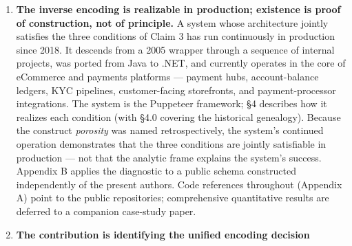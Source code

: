 \documentclass[
]{article}
\providecommand{\tightlist}{%
  \setlength{\itemsep}{0pt}\setlength{\parskip}{0pt}}
\begin{document}
\begin{enumerate}
  \begin{itemize}
  \tightlist
  \item
    \emph{Domain}: one class per role --- one variant per operation
    outcome --- with sum-type discrimination supported natively. The
    form a row takes is determined by the operation that produced it,
    not by the union of possible statuses.
  \item
    \emph{Endpoint}: DTOs with filterable optional parameters; the same
    contract serves heterogeneous use groups but each invocation selects
    only the slots its case expresses.
  \item
    \emph{Persistence}: dense journals of \emph{verbs} rather than
    state. Each entry records the script that executed and exactly the
    inputs that script consumed --- not the type-space of inputs the
    command DTO could accept, not the structural envelope of state at a
    point in time. The state, however rich, is reconstructed
    deterministically by replay.
  \item
    The three mechanisms project the same encoding decision
    (\emph{operation, not envelope}) to three layers.
  \end{itemize}
\item
  \textbf{The inverse encoding is realizable in production; existence is
  proof of construction, not of principle.} A system whose architecture
  jointly satisfies the three conditions of Claim 3 has run continuously
  in production since 2018. It descends from a 2005 wrapper through a
  sequence of internal projects, was ported from Java to .NET, and
  currently operates in the core of eCommerce and payments platforms ---
  payment hubs, account-balance ledgers, KYC pipelines, customer-facing
  storefronts, and payment-processor integrations. The system is the
  Puppeteer framework; §4 describes how it realizes each condition (with
  §4.0 covering the historical genealogy). Because the construct
  \emph{porosity} was named retrospectively, the system's continued
  operation demonstrates that the three conditions are jointly
  satisfiable in production --- not that the analytic frame explains the
  system's success. Appendix B applies the diagnostic to a public schema
  constructed independently of the present authors. Code references
  throughout (Appendix A) point to the public repositories;
  comprehensive quantitative results are deferred to a companion
  case-study paper.
\item
  \textbf{The contribution is identifying the unified encoding decision
}
\end{enumerate}
\end{document}
